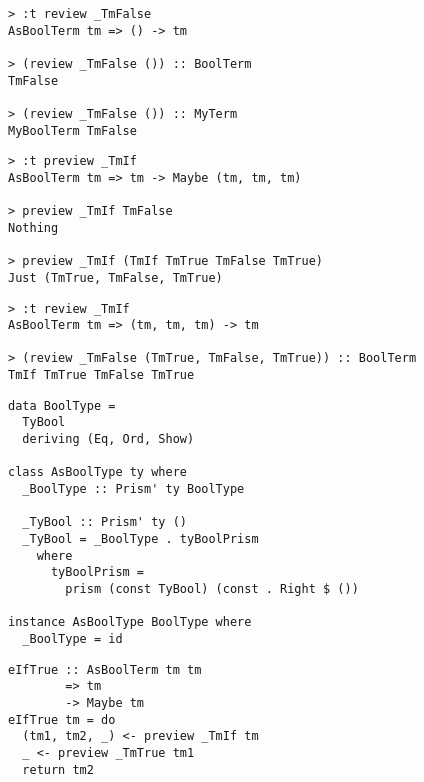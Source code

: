 \documentclass{beamer}
\begin{document}
\begin{frame}[fragile]
  \begin{verbatim}
> :t review _TmFalse
AsBoolTerm tm => () -> tm

> (review _TmFalse ()) :: BoolTerm
TmFalse

> (review _TmFalse ()) :: MyTerm
MyBoolTerm TmFalse
  \end{verbatim}
\end{frame} 

\begin{frame}[fragile]
  \begin{verbatim}
> :t preview _TmIf
AsBoolTerm tm => tm -> Maybe (tm, tm, tm)

> preview _TmIf TmFalse
Nothing

> preview _TmIf (TmIf TmTrue TmFalse TmTrue)
Just (TmTrue, TmFalse, TmTrue)
  \end{verbatim}
\end{frame} 

\begin{frame}[fragile]
  \begin{verbatim}
> :t review _TmIf
AsBoolTerm tm => (tm, tm, tm) -> tm

> (review _TmFalse (TmTrue, TmFalse, TmTrue)) :: BoolTerm
TmIf TmTrue TmFalse TmTrue
  \end{verbatim}
\end{frame} 

\begin{frame}[fragile]
  \begin{verbatim}
data BoolType =
  TyBool
  deriving (Eq, Ord, Show)

class AsBoolType ty where
  _BoolType :: Prism' ty BoolType

  _TyBool :: Prism' ty ()
  _TyBool = _BoolType . tyBoolPrism
    where
      tyBoolPrism =
        prism (const TyBool) (const . Right $ ())

instance AsBoolType BoolType where
  _BoolType = id
  \end{verbatim}
\end{frame} 

\begin{frame}[fragile]
  \begin{verbatim}
eIfTrue :: AsBoolTerm tm tm
        => tm
        -> Maybe tm
eIfTrue tm = do
  (tm1, tm2, _) <- preview _TmIf tm
  _ <- preview _TmTrue tm1
  return tm2
  \end{verbatim}
\end{frame} 
\end{document}
